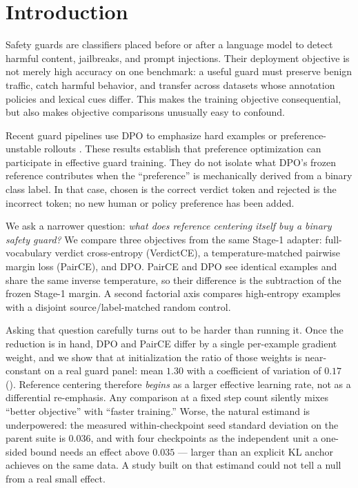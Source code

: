 \section{Introduction}

Safety guards are classifiers placed before or after a language model to detect
harmful content, jailbreaks, and prompt injections. Their deployment objective is
not merely high accuracy on one benchmark: a useful guard must preserve benign
traffic, catch harmful behavior, and transfer across datasets whose annotation
policies and lexical cues differ. This makes the training objective consequential,
but also makes objective comparisons unusually easy to confound.

Recent guard pipelines use DPO to emphasize hard examples or preference-unstable
rollouts \citep{liu2025guardreasoner,ferrao2026aims,liu2026dtguard}. These results
establish that preference optimization can participate in effective guard
training. They do not isolate what DPO's frozen reference contributes when the
``preference'' is mechanically derived from a binary class label. In that case,
chosen is the correct verdict token and rejected is the incorrect token; no new
human or policy preference has been added.

We ask a narrower question: \emph{what does reference centering itself buy a
binary safety guard?} We compare three objectives from the same Stage-1 adapter:
full-vocabulary verdict cross-entropy (VerdictCE), a temperature-matched pairwise
margin loss (PairCE), and DPO. PairCE and DPO see identical examples and share the
same inverse temperature, so their difference is the subtraction of the frozen
Stage-1 margin. A second factorial axis compares high-entropy examples with a
disjoint source/label-matched random control.

Asking that question carefully turns out to be harder than running it. Once the
reduction is in hand, DPO and PairCE differ by a single per-example gradient
weight, and we show that at initialization the ratio of those weights is
near-constant on a real guard panel: mean $1.30$ with a coefficient of variation
of $0.17$ (). Reference centering therefore \emph{begins} as a
larger effective learning rate, not as a differential re-emphasis. Any comparison
at a fixed step count silently mixes ``better objective'' with ``faster
training.'' Worse, the natural estimand is underpowered: the measured
within-checkpoint seed standard deviation on the parent suite is $0.036$, and with
four checkpoints as the independent unit a one-sided bound needs an effect above
$0.035$ --- larger than an explicit KL anchor achieves on the same data. A study
built on that estimand could not tell a null from a real small effect.

